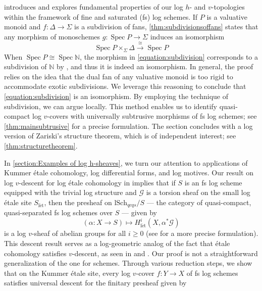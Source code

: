 \documentclass[10pt]{amsart}
\newcommand{\cG}{\mathcal{G}}
\DeclareMathOperator{\Spec}{Spec}
\newcommand{\letale}{\mathrm{l\acute{e}t}}
\newcommand{\lSch}{\mathrm{lSch}}
\begin{document}
 introduces and explores fundamental properties of our log $h$- and $v$-topologies within the framework of fine and saturated (fs) log schemes. If $P$ is a valuative monoid and $f: \Delta \to \Sigma$ is a subdivision of fans, \cref{thm:subdivisionsoffans} states that any morphism of monoschemes $g: \Spec{P} \to \Sigma$ induces an isomorphism
\begin{equation}
\label{equation:subdivision}
\Spec{P} \times_{\Sigma} \Delta \overset{\cong}{\to} \Spec{P}
\end{equation}
When $\Spec{P} \cong \Spec{\mathbb{N}}$, the morphism in \eqref{equation:subdivision} corresponds to a subdivision of $\mathbb{N}$ by \cite[Lemma A.3.11]{logDM}, and thus it is indeed an isomorphism. In general, the proof relies on the idea that the dual fan of any valuative monoid is too rigid to accommodate exotic subdivisions. We leverage this reasoning to conclude that \eqref{equation:subdivision} is an isomorphism. By employing the technique of subdivision, we can argue locally. This method enables us to identify quasi-compact log $v$-covers with universally subtrusive morphisms of fs log schemes; see \cref{thm:mainsubtrusive} for a precise formulation. The section concludes with a log version of Zariski's structure theorem, which is of independent interest; see \cref{thm:structuretheorem}.
\vspace{0,1in}

In \cref{section:Examples of log h-sheaves}, we turn our attention to applications of Kummer étale cohomology, log differential forms, and log motives. Our result on log \( v \)-descent for log étale cohomology in  implies that if \( S \) is an fs log scheme equipped with the trivial log structure and \( \cG \) is a torsion sheaf on the small log étale site \( S_{\letale} \), then the presheaf on \( \lSch_{qcqs}/S \) — the category of quasi-compact, quasi-separated fs log schemes over \( S \) — given by 
\[
(\alpha\colon X\to S) \mapsto H^i_{\letale}(X,\alpha^*\cG)
\]
is a log \( v \)-sheaf of abelian groups for all \( i \geq 0 \) (see  for a more precise formulation). This descent result serves as a log-geometric analog of the fact that étale cohomology satisfies \( v \)-descent, as seen in \cite[Exposé Vbis]{SGA4} and \cite[Proposition 5.3.3]{CDEtale}. Our proof is not a straightforward generalization of the one for schemes. Through various reduction steps, we show that on the Kummer étale site, every log \( v \)-cover \( f\colon Y \to X \) of fs log schemes satisfies universal descent for the finitary presheaf given by 
\end{document}
